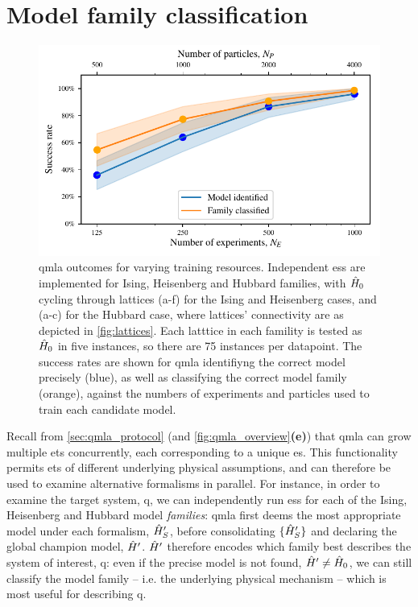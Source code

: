 \section{Model family classification}\label{sec:family_classification}
\begin{figure}[t]
    \begin{center}
        \includegraphics{theoretical_study/figures/model_family_search.pdf}
    \end{center}
    \caption[QMLA outcomes for varying training resources]{
        \gls{qmla} outcomes for varying training resources. 
        Independent \glspl{es} are implemented for Ising, Heisenberg and Hubbard families, 
            with $\hat{H}_0$ cycling through lattices (a-f) for the Ising and Heisenberg cases, 
            and (a-c) for the Hubbard case, where lattices' connectivity are as depicted in \cref{fig:lattices}.
        Each latttice in each famility is tested as $\hat{H}_0$ in five \glspl{instance}, so there are 75 \glspl{instance} per datapoint. 
        The success rates are shown for \gls{qmla} identifiyng the correct model precisely (blue),
            as well as classifying the correct model family (orange), 
            against the numbers of experiments and \glspl{particle} used to train each candidate model. 
        \figtableref
    }
    \label{fig:family_classification}
\end{figure}



Recall from \cref{sec:qmla_protocol} (and \cref{fig:qmla_overview}\textbf{(e)}) that \gls{qmla} 
    can grow multiple \glspl{et} concurrently, each corresponding to a unique \gls{es}. 
This functionality permits \glspl{et} of different underlying physical assumptions, 
    and can therefore be used to examine alternative formalisms in parallel.
For instance, in order to examine the target system, \gls{q}, 
    we can independently run \glspl{es} for each of the Ising, Heisenberg and Hubbard model \emph{families}:
    \gls{qmla} first deems the most appropriate model under each formalism, $\hat{H}^{\prime}_S$,
    before consolidating $\{\hat{H}^{\prime}_S\}$ and declaring the global \gls{champion model}, $\hat{H}^{\prime}$. 
$\hat{H}^{\prime}$ therefore encodes which family best describes the system of interest, \gls{q}:
    even if the precise model is not found, $\hat{H}^{\prime} \neq \hat{H}_0$, we can still classify the 
    model family -- i.e. the underlying physical mechanism -- which is most useful for describing \gls{q}. 
\par 

